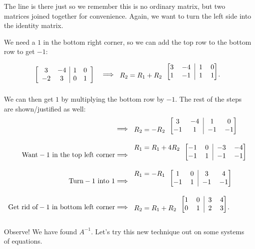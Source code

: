 \documentclass[../gatm.tex]{subfiles}
\begin{document}
\noindent The line is there just so we remember this is no ordinary matrix, but two matrices joined together for convenience. Again, we want to turn the left side into the identity matrix.

We need a $1$ in the bottom right corner, so we can add the top row to the bottom row to get $-1$:

$$\left[\begin{array}{cc|cc} 3 & -4 & 1 & 0 \\ -2 & 3 & 0 & 1 \end{array}\right]\quad\Longrightarrow
\begin{blockarray}{c[cc|cc]}
& 3 & -4 & 1 & 0 \\
R_2=R_1+R_2 & 1 & -1 & 1 & 1
\end{blockarray}.$$

\noindent We can then get $1$ by multiplying the bottom row by $-1$. The rest of the steps are shown/justified as well:
\begin{align*}
&\Longrightarrow
\begin{blockarray}{c[cc|cc]}
& 3 & -4 & 1 & 0 \\
R_2=-R_2 & -1 & 1 & -1 & -1
\end{blockarray} \\
\text{Want}-1\text{ in the top left corner} &\Longrightarrow
\begin{blockarray}{c[cc|cc]}
R_1=R_1+4R_2 & -1 & 0 & -3 & -4 \\
& -1 & 1 & -1 & -1
\end{blockarray} \\
\text{Turn}-1\text{ into }1 &\Longrightarrow
\begin{blockarray}{c[cc|cc]}
R_1=-R_1 & 1 & 0 & 3 & 4 \\
& -1 & 1 & -1 & -1
\end{blockarray} \\
\text{Get rid of}-1\text{ in bottom left corner}&\Longrightarrow
\begin{blockarray}{c[cc|cc]}
& 1 & 0 & 3 & 4 \\
R_2=R_1+R_2 & 0 & 1 & 2 & 3
\end{blockarray}. \\
\end{align*}

\noindent Observe! We have found $A^{-1}$. Let's try this new technique out on some systems of equations.
\end{document}
